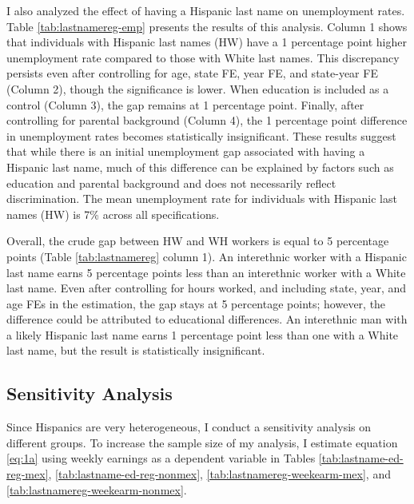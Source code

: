 I also analyzed the effect of having a Hispanic last name on unemployment rates. Table \ref{tab:lastnamereg-emp} presents the results of this analysis. Column 1 shows that individuals with Hispanic last names (HW) have a 1 percentage point higher unemployment rate compared to those with White last names. This discrepancy persists even after controlling for age, state FE, year FE, and state-year FE (Column 2), though the significance is lower. When education is included as a control (Column 3), the gap remains at 1 percentage point. Finally, after controlling for parental background (Column 4), the 1 percentage point difference in unemployment rates becomes statistically insignificant. These results suggest that while there is an initial unemployment gap associated with having a Hispanic last name, much of this difference can be explained by factors such as education and parental background and does not necessarily reflect discrimination. The mean unemployment rate for individuals with Hispanic last names (HW) is 7\% across all specifications.

Overall, the crude gap between HW and WH workers is equal to 5 percentage points (Table \ref{tab:lastnamereg} column 1). An interethnic worker with a Hispanic last name earns 5 percentage points less than an interethnic worker with a White last name. Even after controlling for hours worked, and including state, year, and age FEs in the estimation, the gap stays at 5 percentage points; however, the difference could be attributed to educational differences. An interethnic man with a likely Hispanic last name earns 1 percentage point less than one with a White last name, but the result is statistically insignificant.


\subsection{Sensitivity Analysis}

Since Hispanics are very heterogeneous, I conduct a sensitivity analysis on different groups. To increase the sample size of my analysis, I estimate equation \ref{eq:1a} using weekly earnings as a dependent variable in Tables \ref{tab:lastname-ed-reg-mex}, \ref{tab:lastname-ed-reg-nonmex}, \ref{tab:lastnamereg-weekearm-mex}, and \ref{tab:lastnamereg-weekearm-nonmex}. 

